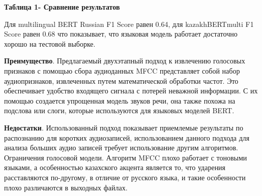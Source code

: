 {\bfseries Таблица 1- Сравнение результатов}


Для multilingual BERT Russian F1 Score равен 0.64, для kazakhBERTmulti
F1 Score равен 0.68 что показывает, что языковая модель работает
достаточно хорошо на тестовой выборке.

{\bfseries Преимущество}. Предлагаемый двухэтапный подход к извлечению
голосовых признаков с помощью сбора аудиоданных MFCC представляет собой
набор аудиопризнаков, извлеченных путем математической обработки частот.
Это обеспечивает удобство входящего сигнала с потерей неважной
информации. С их помощью создается упрощенная модель звуков речи, она
также похожа на подслова или слоги, которые используются для языковых
моделей BERT.

{\bfseries Недостатки}. Использованный подход показывает приемлемые
результаты по распознанию для коротких аудиозаписей, использованием
данного подхода для анализа больших аудио записей требует использование
другим алгоритмов. Ограничения голосовой модели. Алгоритм MFCC плохо
работает с тоновыми языками, а особенностью казахского акцента является
то, что ударения расставляются по-другому, в отличие от русского языка,
и такие особенности плохо различаются в выходных файлах.

